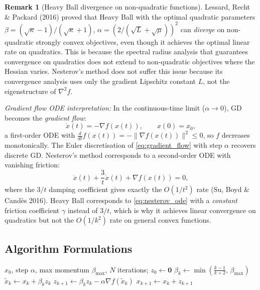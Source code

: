 \documentclass[11pt,a4paper]{article}
\theoremstyle{definition}
\newtheorem{remark}[theorem]{Remark}
\begin{document}
\begin{remark}[Heavy Ball divergence on non-quadratic functions]
Lessard, Recht \& Packard (2016) proved that Heavy Ball with the optimal quadratic parameters $\beta = (\sqrt{\kappa}-1)/(\sqrt{\kappa}+1)$, $\alpha = (2/(\sqrt{L}+\sqrt{\mu}))^2$ can \emph{diverge} on non-quadratic strongly convex objectives, even though it achieves the optimal linear rate on quadratics. This is because the spectral radius analysis that guarantees convergence on quadratics does not extend to non-quadratic objectives where the Hessian varies. Nesterov's method does not suffer this issue because its convergence analysis uses only the gradient Lipschitz constant $L$, not the eigenstructure of $\nabla^2 f$.
\end{remark}

\noindent\textit{Gradient flow ODE interpretation:} In the continuous-time limit ($\alpha \to 0$), GD becomes the \emph{gradient flow}:
\begin{equation}
\dot{x}(t) = -\nabla f(x(t)), \qquad x(0) = x_0,
\label{eq:gradient_flow}
\end{equation}
a first-order ODE with $\frac{d}{dt}f(x(t)) = -\|\nabla f(x(t))\|^2 \leq 0$, so $f$ decreases monotonically. The Euler discretisation of \eqref{eq:gradient_flow} with step $\alpha$ recovers discrete GD. Nesterov's method corresponds to a second-order ODE with vanishing friction:
\begin{equation}
\ddot{x}(t) + \frac{3}{t}\dot{x}(t) + \nabla f(x(t)) = 0,
\label{eq:nesterov_ode}
\end{equation}
where the $3/t$ damping coefficient gives exactly the $O(1/t^2)$ rate (Su, Boyd \& Candès 2016). Heavy Ball corresponds to \eqref{eq:nesterov_ode} with a \emph{constant} friction coefficient $\gamma$ instead of $3/t$, which is why it achieves linear convergence on quadratics but not the $O(1/k^2)$ rate on general convex functions.

\subsection{Algorithm Formulations}

\begin{algorithm}[H]
\caption{Nesterov Accelerated Gradient}
\label{alg:nesterov}
\begin{algorithmic}[1]
\Require $x_0$, step $\alpha$, max momentum $\beta_{\max}$, $N$ iterations; $z_0 \gets \mathbf{0}$
    \State $\beta_k \gets \min\!\left(\frac{k-1}{k+2},\, \beta_{\max}\right)$ 
    \State $\tilde{x}_k \gets x_k + \beta_k z_k$ 
    \State $z_{k+1} \gets \beta_k z_k - \alpha \nabla f(\tilde{x}_k)$ 
    \State $x_{k+1} \gets x_k + z_{k+1}$
\EndFor
\end{algorithmic}
\end{algorithm}
\end{document}
